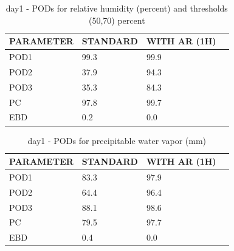 \begin{table}[p!]
\begin{center}
\begin{tabular}{|l|l|l|l|}
\hline
\multicolumn{1}{|c|}{\cellcolor[HTML]{C0C0C0}\textbf{PARAMETER}} & \multicolumn{1}{c|}{\cellcolor[HTML]{C0C0C0}\textbf{STANDARD}} & \multicolumn{1}{c|}{\cellcolor[HTML]{C0C0C0}\textbf{WITH AR (1H)}} \\
\hline
\cellcolor[HTML]{C0C0C0}POD1  & 99.3                                & 99.9         \\
\cellcolor[HTML]{C0C0C0}POD2  & 37.9                                & 94.3         \\
\cellcolor[HTML]{C0C0C0}POD3  & 35.3                                & 84.3         \\
\cellcolor[HTML]{C0C0C0}PC    & 97.8                                & 99.7           \\
\cellcolor[HTML]{C0C0C0}EBD   & 0.2                                & 0.0          \\
\hline
\end{tabular}
\caption{day1 - PODs for relative humidity (percent) and thresholds (50,70) percent}
\label{tab:podrhFT:day1}
\end{center}
\end{table}
\begin{table}[p!]
\begin{center}
\begin{tabular}{|l|l|l|l|}
\hline
\multicolumn{1}{|c|}{\cellcolor[HTML]{C0C0C0}\textbf{PARAMETER}} & \multicolumn{1}{c|}{\cellcolor[HTML]{C0C0C0}\textbf{STANDARD}} & \multicolumn{1}{c|}{\cellcolor[HTML]{C0C0C0}\textbf{WITH AR (1H)}} \\
\hline
\cellcolor[HTML]{C0C0C0}POD1  & 83.3                                & 97.9         \\
\cellcolor[HTML]{C0C0C0}POD2  & 64.4                                & 96.4         \\
\cellcolor[HTML]{C0C0C0}POD3  & 88.1                                & 98.6         \\
\cellcolor[HTML]{C0C0C0}PC    & 79.5                                  & 97.7           \\
\cellcolor[HTML]{C0C0C0}EBD   & 0.4                                 & 0.0          \\
\hline
\end{tabular}
\caption{day1 - PODs for precipitable water vapor (mm)}
\label{tab:podpwv:day1}
\end{center}
\end{table}
